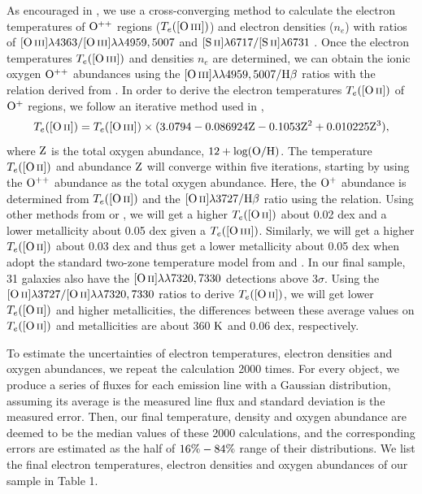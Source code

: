\documentclass[usenatbib]{raa}
\begin{document}
As encouraged in \cite{2015AA...573A..42L}, we use a cross-converging method to 
calculate 
the electron temperatures of $\rm O^{++}$ regions ($T_e(\hbox{[O\,{\sc iii}]})$) and electron 
densities
($n_e$) with ratios of
 $\hbox{[O\,{\sc iii}]}\lambda4363/\hbox{[O\,{\sc iii}]}\lambda\lambda4959,5007$ \citep{2013ApJS..207...21N} 
 and $\hbox{[S\,{\sc ii}]}\lambda6717/\hbox{[S\,{\sc ii}]}\lambda6731$ \citep{2010ApJS..188...32T}.
  Once the electron temperatures $T_e(\hbox{[O\,{\sc iii}]})$
 and densities $n_e$ are determined, we can obtain the ionic oxygen $\rm O^{++}$ 
abundances 
 using the $\hbox{[O\,{\sc iii}]}\lambda\lambda4959,5007/\hbox{H$\beta$}$ ratios with the relation 
derived from  \cite{2006AA...448..955I}.  
In order to derive the electron temperatures $T_e(\hbox{[O\,{\sc ii}]})$ of $\rm O^+$ regions, 
we follow an
iterative method used in \cite{2014ApJ...786..155N},
\begin{equation}
 T_e(\hbox{[O\,{\sc ii}]}) = T_e(\hbox{[O\,{\sc iii}]}) \times \rm (3.0794-0.086924Z-0.1053Z^2+0.010225Z^3),
\label{te_oii_zoh}
\end{equation}
where $\rm Z$ is the total oxygen abundance, $\rm 12+log(O/H)$.
The temperature $T_e(\hbox{[O\,{\sc ii}]})$ and abundance $\rm Z$ will converge within five 
iterations,
starting by using the $\rm O^{++}$ abundance as the total oxygen abundance. 
 Here, the $\rm O^{+}$ abundance is determined from $T_e(\hbox{[O\,{\sc ii}]})$ and the 
$\hbox{[O\,{\sc ii}]}\lambda3727/\hbox{H$\beta$}$ ratio using the \cite{2006AA...448..955I} relation. 
Using other methods from \cite{1992AJ....103.1330G} or 
\cite{2012MNRAS.426.2630L},
we will get a higher $T_e(\hbox{[O\,{\sc ii}]})$ about 0.02 dex and a lower metallicity 
about 0.05 dex  given a $T_e(\hbox{[O\,{\sc iii}]})$. Similarly, we will get a higher 
$T_e(\hbox{[O\,{\sc ii}]})$  about 0.03 dex and thus get a lower metallicity about 0.05 dex 
when adopt the standard two-zone temperature model from 
\cite{2006AA...448..955I} and \cite{2013ApJ...765..140A}. 
In our final sample, 31 galaxies also have the 
$\hbox{[O\,{\sc ii}]}\lambda\lambda7320,7330$  detections above 3$\sigma$.   Using the 
$\hbox{[O\,{\sc ii}]}\lambda3727/\hbox{[O\,{\sc ii}]}\lambda\lambda7320,7330$ ratios to derive $T_e(\hbox{[O\,{\sc ii}]})$, 
we will get lower $T_e(\hbox{[O\,{\sc ii}]})$ and higher 
metallicities, the differences between these average values on $T_e(\hbox{[O\,{\sc ii}]})$ 
and metallicities are about 360 $\rm K$ and 0.06 dex, respectively.

To estimate the uncertainties of electron temperatures, electron densities and 
oxygen
abundances, we repeat the calculation 2000 times. For every object, we produce a 
series
of fluxes for each emission line with a Gaussian distribution, assuming its 
average is 
the measured line flux and standard deviation is the measured error. Then, our 
final 
temperature, density and oxygen abundance are deemed to be the median values of 
these
2000 calculations, and the corresponding errors are estimated as the half of 
$16\%\--84\%$ range of their distributions.     
We list the final electron temperatures, electron densities and oxygen 
abundances
of our sample in Table 1. 
\end{document}
